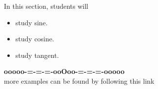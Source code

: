 \documentclass{ximera}
\begin{document}
\begin{sectionOutcomes}
In this section, students will 

\begin{itemize}
\item study sine.
\item study cosine.
\item study tangent.
\end{itemize}
\end{sectionOutcomes}





















\begin{onlineOnly}
\begin{center}
\textbf{\textcolor{green!50!black}{ooooo-=-=-=-ooOoo-=-=-=-ooooo}} \\

more examples can be found by following this link\\ 

\end{center}
\end{onlineOnly}
\end{document}
